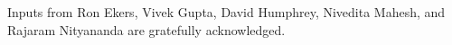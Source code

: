 \documentclass[
  journal=pasa,
  manuscript=article-type,
  year=2020,
  volume=37,
]{cup-journal}
\begin{document}


\begin{acknowledgement}
Inputs from Ron Ekers, Vivek Gupta, David Humphrey, Nivedita Mahesh, and Rajaram Nityananda are gratefully acknowledged. 
\end{acknowledgement}







\printendnotes





\end{document}
